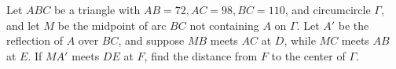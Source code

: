 Let $ABC$ be a triangle with $AB=72,AC=98,BC=110$, and circumcircle $\Gamma$, and let $M$ be the midpoint of arc $BC$ not containing $A$ on $\Gamma$. Let $A'$ be the reflection of $A$ over $BC$, and suppose $MB$ meets $AC$ at $D$, while $MC$ meets $AB$ at $E$. If $MA'$ meets $DE$ at $F$, find the distance from $F$ to the center of $\Gamma$.
